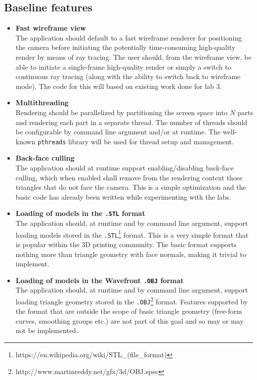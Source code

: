 \documentclass[a4paper,11pt]{article}
\begin{document}
\subsection*{Baseline features}
\begin{itemize}
\item \textbf{Fast wireframe view}\\
The application should default to a fast wireframe renderer for positioning the camera before
initiating the potentially time-consuming high-quality render by means of ray tracing. The user
should, from the wireframe view, be able to initiate a single-frame high-quality render or simply
a switch to continuous ray tracing (along with the ability to switch back to wireframe mode). The
code for this will based on existing work done for lab 3.

\item \textbf{Multithreading}\\
Rendering should be parallelized by partitioning the screen space into $N$ parts and rendering each
part in a separate thread. The number of threads should be configurable by command line argument and/or
at runtime. The well-known \texttt{pthreads} library will be used for thread setup and management.

\item \textbf{Back-face culling}\\
The application should at runtime support enabling/disabling back-face culling, which when enabled shall
remove from the rendering context those triangles that do not face the camera. This is a simple
optimization and the basic code has already been written while experimenting with the labs.

\item \textbf{Loading of models in the \texttt{.STL} format}\\
The application should, at runtime and by command line argument, support loading models stored in the
\texttt{.STL}\footnote{https://en.wikipedia.org/wiki/STL\_(file\_format)} format. This is a very simple format that is popular within the 3D printing community.
The basic format supports nothing more than triangle geometry with face normals, making it trivial
to implement.

\item \textbf{Loading of models in the Wavefront \texttt{.OBJ} format}\\
The application should, at runtime and by command line argument, support loading triangle geometry
stored in the \texttt{.OBJ}\footnote{http://www.martinreddy.net/gfx/3d/OBJ.spec} format. Features
supported by the format that are outside the scope of basic triangle geometry (free-form curves,
smoothing groups etc.) are not part of this goal and so may or may not be implemented.


\end{itemize}
\end{document}
